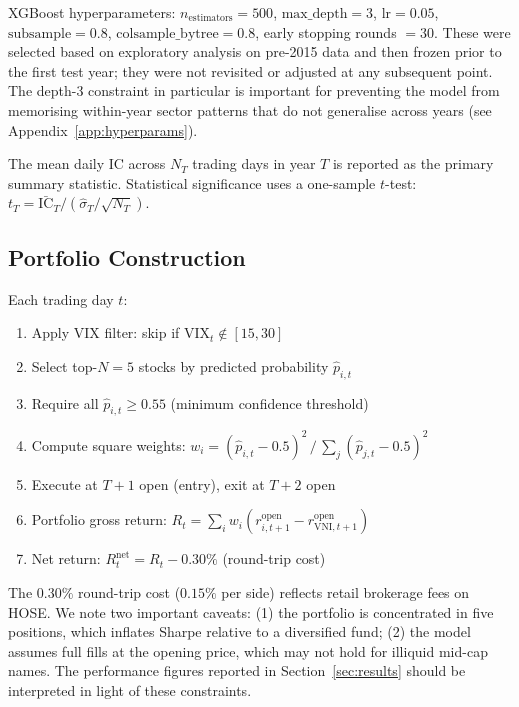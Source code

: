 \documentclass[12pt,a4paper]{article}
\begin{document}
XGBoost hyperparameters: $n_{\text{estimators}}=500$, $\text{max\_depth}=3$,
$\text{lr}=0.05$, $\text{subsample}=0.8$, $\text{colsample\_bytree}=0.8$,
early stopping rounds $= 30$.
These were selected based on exploratory analysis on pre-2015 data and then frozen
prior to the first test year; they were not revisited or adjusted at any subsequent
point. The depth-3 constraint in particular is important for preventing the model
from memorising within-year sector patterns that do not generalise across years
(see Appendix~\ref{app:hyperparams}).

The mean daily IC across $N_T$ trading days in year $T$ is reported as the primary
summary statistic. Statistical significance uses a one-sample $t$-test:
$t_T = \bar{\text{IC}}_T / (\hat{\sigma}_T / \sqrt{N_T})$.

\subsection{Portfolio Construction}
\label{sec:portfolio}

Each trading day $t$:
\begin{enumerate}
  \item Apply VIX filter: skip if $\text{VIX}_t \notin [15, 30]$
  \item Select top-$N=5$ stocks by predicted probability $\hat{p}_{i,t}$
  \item Require all $\hat{p}_{i,t} \geq 0.55$ (minimum confidence threshold)
  \item Compute square weights:
        $w_i = (\hat{p}_{i,t} - 0.5)^2 \,/\, \sum_j (\hat{p}_{j,t} - 0.5)^2$
  \item Execute at $T+1$ open (entry), exit at $T+2$ open
  \item Portfolio gross return:
        $R_t = \sum_i w_i (r_{i,t+1}^{\text{open}} - r_{\text{VNI},t+1}^{\text{open}})$
  \item Net return: $R_t^{\text{net}} = R_t - 0.30\%$ (round-trip cost)
\end{enumerate}

The $0.30\%$ round-trip cost ($0.15\%$ per side) reflects retail brokerage fees
on HOSE. We note two important caveats: (1) the portfolio is concentrated in
five positions, which inflates Sharpe relative to a diversified fund; (2) the
model assumes full fills at the opening price, which may not hold for illiquid
mid-cap names. The performance figures reported in Section~\ref{sec:results}
should be interpreted in light of these constraints.
\end{document}

